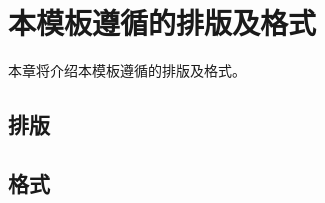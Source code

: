 \chapter{本模板遵循的排版及格式}
\label{cha:format}
本章将介绍本模板遵循的排版及格式。
\section{排版}
\label{sec:organization}

\section{格式}
\label{sec:format}